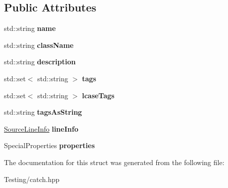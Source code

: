 \subsection*{Public Attributes}
\begin{DoxyCompactItemize}
\item 
\hypertarget{struct_catch_1_1_test_case_info_a463794e2f5cfead307c93efd134ade36}{std\-::string {\bfseries name}}\label{struct_catch_1_1_test_case_info_a463794e2f5cfead307c93efd134ade36}

\item 
\hypertarget{struct_catch_1_1_test_case_info_a1a5e0825132a38d091defdebbf2f8ce9}{std\-::string {\bfseries class\-Name}}\label{struct_catch_1_1_test_case_info_a1a5e0825132a38d091defdebbf2f8ce9}

\item 
\hypertarget{struct_catch_1_1_test_case_info_a37fe2db9425bc45f6a33893eac31198e}{std\-::string {\bfseries description}}\label{struct_catch_1_1_test_case_info_a37fe2db9425bc45f6a33893eac31198e}

\item 
\hypertarget{struct_catch_1_1_test_case_info_a045f62e7719a8760a5b456f7fd2dc97c}{std\-::set$<$ std\-::string $>$ {\bfseries tags}}\label{struct_catch_1_1_test_case_info_a045f62e7719a8760a5b456f7fd2dc97c}

\item 
\hypertarget{struct_catch_1_1_test_case_info_a0ed3864a313e8ddc3ae38431be5be9ae}{std\-::set$<$ std\-::string $>$ {\bfseries lcase\-Tags}}\label{struct_catch_1_1_test_case_info_a0ed3864a313e8ddc3ae38431be5be9ae}

\item 
\hypertarget{struct_catch_1_1_test_case_info_ac65c2d36fd36f71e9bf782b2ea245c64}{std\-::string {\bfseries tags\-As\-String}}\label{struct_catch_1_1_test_case_info_ac65c2d36fd36f71e9bf782b2ea245c64}

\item 
\hypertarget{struct_catch_1_1_test_case_info_aa9407b7f442655b51a2aad24b3fa2fd3}{\hyperlink{struct_catch_1_1_source_line_info}{Source\-Line\-Info} {\bfseries line\-Info}}\label{struct_catch_1_1_test_case_info_aa9407b7f442655b51a2aad24b3fa2fd3}

\item 
\hypertarget{struct_catch_1_1_test_case_info_afc1e84bd7a2e180895a06d9131302af0}{Special\-Properties {\bfseries properties}}\label{struct_catch_1_1_test_case_info_afc1e84bd7a2e180895a06d9131302af0}

\end{DoxyCompactItemize}


The documentation for this struct was generated from the following file\-:\begin{DoxyCompactItemize}
\item 
Testing/catch.\-hpp\end{DoxyCompactItemize}

